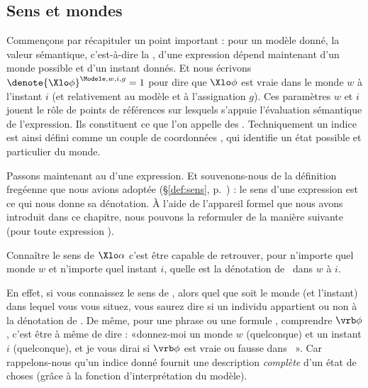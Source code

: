 
\subsection{Sens et mondes}

Commençons par récapituler un point important : pour un modèle donné,
la valeur sémantique, c'est-à-dire la , 
d'une expression dépend maintenant d'un monde possible et d'un instant
donnés. Et nous écrivons 
\(\denote{\Xlo\phi}^{\Modele,w,i,g}=1\)
 pour
dire que $\Xlo\phi$ est vraie dans le monde $w$ à l'instant $i$ (et
relativement au modèle {\Modele} et à l'assignation $g$).  Ces
paramètres $w$ et $i$ jouent le rôle de points de références sur
lesquels s'appuie l'évaluation sémantique de l'expression.  Ils
constituent ce que l'on appelle des . 
Techniquement un indice est ainsi défini
comme un couple de coordonnées , qui identifie un état possible et particulier du monde.  


Passons maintenant au  d'une expression.  Et souvenons-nous
de la définition fregéenne que nous avions adoptée
(\S\ref{def:sens}, p.~\pageref{def:sens}) : le sens d'une expression
est ce qui nous donne sa dénotation.  À l'aide
de l'appareil formel que nous avons introduit dans ce chapitre, nous
pouvons la reformuler de la manière suivante (pour toute expression \vrb\alpha).

\begin{point}\label{pt:sensw}
{Connaître le
sens de $\Xlo\alpha$ c'est être capable de retrouver, pour n'importe quel monde
$w$ et n'importe quel instant $i$, quelle est la dénotation de \vrb\alpha\ dans $w$ à $i$.}
\end{point}
%

En effet, si vous connaissez le sens de , alors quel que soit le monde (et l'instant) dans lequel vous vous situez, vous saurez dire si un individu appartient ou non à la dénotation de .
De même, pour une phrase ou une formule \vrb\phi, comprendre $\vrb\phi$, c'est être à même de dire : «donnez-moi
un monde $w$ (quelconque) et un instant $i$ (quelconque), et je vous dirai si $\vrb\phi$ est vraie ou
fausse dans ~».  Car rappelons-nous qu'un indice  donné fournit
une description \emph{complète} d'un état de choses (grâce à la fonction d'interprétation {\FI} du modèle).

